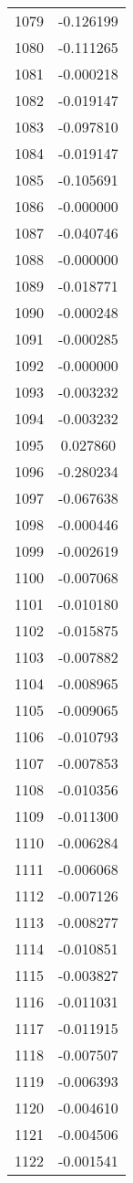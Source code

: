\documentclass[12pt]{article}
\begin{document}
\begin{longtable}{@{}cc@{}}
1079 & -0.126199 \\
1080 & -0.111265 \\
1081 & -0.000218 \\
1082 & -0.019147 \\
1083 & -0.097810 \\
1084 & -0.019147 \\
1085 & -0.105691 \\
1086 & -0.000000 \\
1087 & -0.040746 \\
1088 & -0.000000 \\
1089 & -0.018771 \\
1090 & -0.000248 \\
1091 & -0.000285 \\
1092 & -0.000000 \\
1093 & -0.003232 \\
1094 & -0.003232 \\
1095 & 0.027860 \\
1096 & -0.280234 \\
1097 & -0.067638 \\
1098 & -0.000446 \\
1099 & -0.002619 \\
1100 & -0.007068 \\
1101 & -0.010180 \\
1102 & -0.015875 \\
1103 & -0.007882 \\
1104 & -0.008965 \\
1105 & -0.009065 \\
1106 & -0.010793 \\
1107 & -0.007853 \\
1108 & -0.010356 \\
1109 & -0.011300 \\
1110 & -0.006284 \\
1111 & -0.006068 \\
1112 & -0.007126 \\
1113 & -0.008277 \\
1114 & -0.010851 \\
1115 & -0.003827 \\
1116 & -0.011031 \\
1117 & -0.011915 \\
1118 & -0.007507 \\
1119 & -0.006393 \\
1120 & -0.004610 \\
1121 & -0.004506 \\
1122 & -0.001541 \\

\end{longtable}
\end{document}
